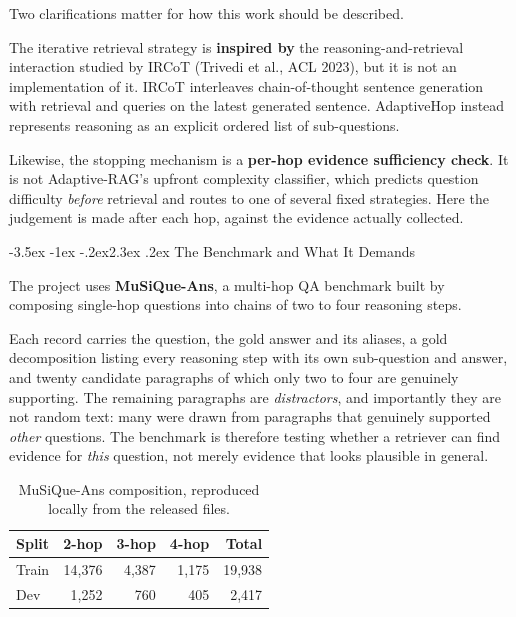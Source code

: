 \documentclass[11pt,a4paper]{article}
\makeatletter
\renewcommand\section{\@startsection{section}{1}{\z@}%
  {-3.5ex \@plus -1ex \@minus -.2ex}{2.3ex \@plus.2ex}%
  {\color{ink}\normalfont\Large\bfseries}}
\makeatother
\begin{document}
Two clarifications matter for how this work should be described.

The iterative retrieval strategy is \textbf{inspired by} the reasoning-and-retrieval
interaction studied by IRCoT (Trivedi et al., ACL 2023), but it is not an
implementation of it. IRCoT interleaves chain-of-thought sentence generation
with retrieval and queries on the latest generated sentence. AdaptiveHop instead
represents reasoning as an explicit ordered list of sub-questions.

Likewise, the stopping mechanism is a \textbf{per-hop evidence sufficiency
check}. It is not Adaptive-RAG's upfront complexity classifier, which predicts
question difficulty \emph{before} retrieval and routes to one of several fixed
strategies. Here the judgement is made after each hop, against the evidence
actually collected.

\section{The Benchmark and What It Demands}

The project uses \textbf{MuSiQue-Ans}, a multi-hop QA benchmark built by
composing single-hop questions into chains of two to four reasoning steps.

Each record carries the question, the gold answer and its aliases, a gold
decomposition listing every reasoning step with its own sub-question and answer,
and twenty candidate paragraphs of which only two to four are genuinely
supporting. The remaining paragraphs are \emph{distractors}, and importantly they
are not random text: many were drawn from paragraphs that genuinely supported
\emph{other} questions. The benchmark is therefore testing whether a retriever
can find evidence for \emph{this} question, not merely evidence that looks
plausible in general.

\begin{table}[H]
\centering
\caption{MuSiQue-Ans composition, reproduced locally from the released files.}
\begin{tabular}{lrrrr}
\toprule
\textbf{Split} & \textbf{2-hop} & \textbf{3-hop} & \textbf{4-hop} & \textbf{Total} \\
\midrule
Train & 14{,}376 & 4{,}387 & 1{,}175 & 19{,}938 \\
Dev   & 1{,}252  & 760     & 405     & 2{,}417  \\
\bottomrule
\end{tabular}
\end{table}
\end{document}
